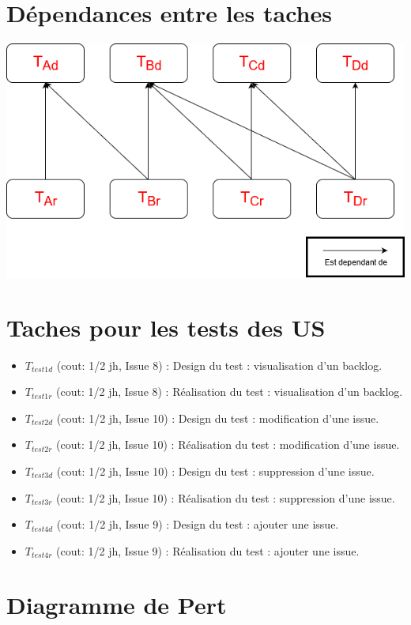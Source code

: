 \documentclass[french]{article}
\begin{document}
\section{Dépendances entre les taches}
\includegraphics[scale=0.55]{task_dependancy_sprint_1.png}

\section{Taches pour les tests des US}
\begin{itemize}
    \item $T_{test1d}$ (cout: 1/2 jh, Issue 8) : Design du test : visualisation d'un backlog.
    \item $T_{test1r}$ (cout: 1/2 jh, Issue 8) : Réalisation du test : visualisation d'un backlog.
    \item $T_{test2d}$ (cout: 1/2 jh, Issue 10) : Design du test : modification d'une issue.
    \item $T_{test2r}$ (cout: 1/2 jh, Issue 10) : Réalisation du test : modification d'une issue.
    \item $T_{test3d}$ (cout: 1/2 jh, Issue 10) : Design du test : suppression d'une issue.
    \item $T_{test3r}$ (cout: 1/2 jh, Issue 10) : Réalisation du test : suppression d'une issue.
    \item $T_{test4d}$ (cout: 1/2 jh, Issue 9) : Design du test : ajouter une issue.
    \item $T_{test4r}$ (cout: 1/2 jh, Issue 9) : Réalisation du test : ajouter une issue.
\end{itemize}

\section{Diagramme de Pert}
\newpage
{}
\end{document}
